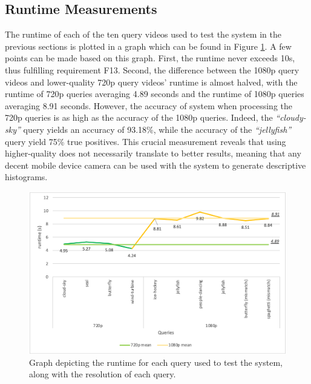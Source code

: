
\subsection{Runtime Measurements}

The runtime of each of the ten query videos used to test the system in the previous sections is plotted in a graph which can be found in Figure \ref{fig:evaluation-runtime_plot}. A few points can be made based on this graph. First, the runtime never exceeds 10s, thus fulfilling requirement F13. Second, the difference between the 1080p query videos and lower-quality 720p query videos' runtime is almost halved, with the runtime of 720p queries averaging 4.89 seconds and the runtime of 1080p queries averaging 8.91 seconds. However, the accuracy of system when processing the 720p queries is as high as the accuracy of the 1080p queries. Indeed, the \textit{``cloudy-sky''} query yields an accuracy of 93.18\%, while the accuracy of the \textit{``jellyfish''} query yield 75\% true positives. This crucial measurement reveals that using higher-quality does not necessarily translate to better results, meaning that any decent mobile device camera can be used with the system to generate descriptive histograms.

\begin{figure}[h] 
\centerline{\includegraphics[width=\textwidth]{figures/evaluation/runtime_plot.png}}
\caption{\label{fig:evaluation-runtime_plot}Graph depicting the runtime for each query used to test the system, along with the resolution of each query.}
\end{figure}


